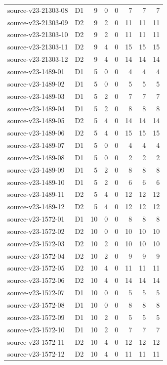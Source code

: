 \begin{longtable}{p{}lrrrrrr}
source-v23-21303-08 & D1 & 9 & 0 & 0 & 7 & 7 & 7\\
source-v23-21303-09 & D2 & 9 & 2 & 0 & 11 & 11 & 11\\
source-v23-21303-10 & D2 & 9 & 2 & 0 & 11 & 11 & 11\\
source-v23-21303-11 & D2 & 9 & 4 & 0 & 15 & 15 & 15\\
source-v23-21303-12 & D2 & 9 & 4 & 0 & 14 & 14 & 14\\
source-v23-1489-01 & D1 & 5 & 0 & 0 & 4 & 4 & 4\\
source-v23-1489-02 & D1 & 5 & 0 & 0 & 5 & 5 & 5\\
source-v23-1489-03 & D1 & 5 & 2 & 0 & 7 & 7 & 7\\
source-v23-1489-04 & D1 & 5 & 2 & 0 & 8 & 8 & 8\\
source-v23-1489-05 & D2 & 5 & 4 & 0 & 14 & 14 & 14\\
source-v23-1489-06 & D2 & 5 & 4 & 0 & 15 & 15 & 15\\
source-v23-1489-07 & D1 & 5 & 0 & 0 & 4 & 4 & 4\\
source-v23-1489-08 & D1 & 5 & 0 & 0 & 2 & 2 & 2\\
source-v23-1489-09 & D1 & 5 & 2 & 0 & 8 & 8 & 8\\
source-v23-1489-10 & D1 & 5 & 2 & 0 & 6 & 6 & 6\\
source-v23-1489-11 & D2 & 5 & 4 & 0 & 12 & 12 & 12\\
source-v23-1489-12 & D2 & 5 & 4 & 0 & 12 & 12 & 12\\
source-v23-1572-01 & D1 & 10 & 0 & 0 & 8 & 8 & 8\\
source-v23-1572-02 & D2 & 10 & 0 & 0 & 10 & 10 & 10\\
source-v23-1572-03 & D2 & 10 & 2 & 0 & 10 & 10 & 10\\
source-v23-1572-04 & D2 & 10 & 2 & 0 & 9 & 9 & 9\\
source-v23-1572-05 & D2 & 10 & 4 & 0 & 11 & 11 & 11\\
source-v23-1572-06 & D2 & 10 & 4 & 0 & 14 & 14 & 14\\
source-v23-1572-07 & D1 & 10 & 0 & 0 & 5 & 5 & 5\\
source-v23-1572-08 & D1 & 10 & 0 & 0 & 8 & 8 & 8\\
source-v23-1572-09 & D1 & 10 & 2 & 0 & 5 & 5 & 5\\
source-v23-1572-10 & D1 & 10 & 2 & 0 & 7 & 7 & 7\\
source-v23-1572-11 & D2 & 10 & 4 & 0 & 12 & 12 & 12\\
source-v23-1572-12 & D2 & 10 & 4 & 0 & 11 & 11 & 11\\

\end{longtable}
